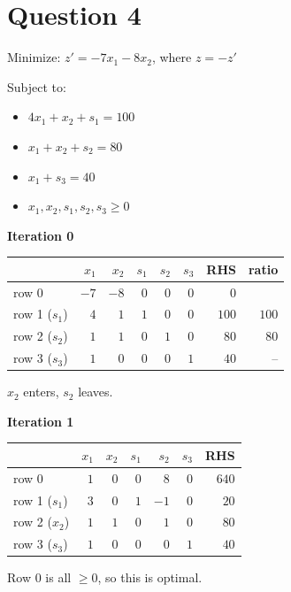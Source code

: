\documentclass{article}
\begin{document}
\section*{Question 4}
Minimize: $z' = -7x_1 - 8x_2$, where $z = -z'$

Subject to:
\begin{itemize}
    \item $4x_1 + x_2 + s_1 = 100$
    \item $x_1 + x_2 + s_2 = 80$
    \item $x_1 + s_3 = 40$
    \item $x_1, x_2, s_1, s_2, s_3 \ge 0$
\end{itemize}

\textbf{Iteration 0}

\begin{center}
\begin{tabular}{lrrrrrrr}
\toprule
 & $x_1$ & $x_2$ & $s_1$ & $s_2$ & $s_3$ & RHS & ratio \\
\midrule
row 0 & $-7$ & $-8$ & $0$ & $0$ & $0$ & $0$ &  \\
row 1 ($s_1$) & $4$ & $1$ & $1$ & $0$ & $0$ & $100$ & $100$ \\
row 2 ($s_2$) & $1$ & $\boxed{1}$ & $0$ & $1$ & $0$ & $80$ & $80$ \\
row 3 ($s_3$) & $1$ & $0$ & $0$ & $0$ & $1$ & $40$ & -- \\
\bottomrule
\end{tabular}
\end{center}

$x_2$ enters, $s_2$ leaves.

\textbf{Iteration 1}

\begin{center}
\begin{tabular}{lrrrrrr}
\toprule
 & $x_1$ & $x_2$ & $s_1$ & $s_2$ & $s_3$ & RHS \\
\midrule
row 0 & $1$ & $0$ & $0$ & $8$ & $0$ & $640$ \\
row 1 ($s_1$) & $3$ & $0$ & $1$ & $-1$ & $0$ & $20$ \\
row 2 ($x_2$) & $1$ & $1$ & $0$ & $1$ & $0$ & $80$ \\
row 3 ($s_3$) & $1$ & $0$ & $0$ & $0$ & $1$ & $40$ \\
\bottomrule
\end{tabular}
\end{center}

Row 0 is all $\ge 0$, so this is optimal.
\end{document}
